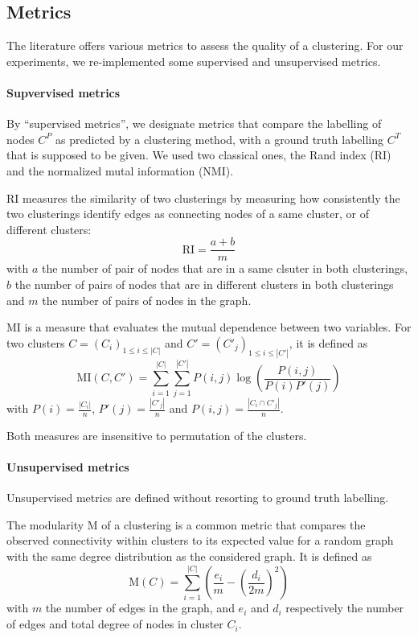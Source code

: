 \documentclass[switch, 12pt]{article}
\begin{document}
\begin{multicols}{2}
    \subsection{Metrics}
    \label{subsec:metrics}

    The literature offers various metrics to assess the quality of a clustering. For our experiments, we re-implemented some supervised and unsupervised metrics.

    \paragraph{Supvervised metrics} By ``supervised metrics'', we designate metrics that compare the labelling of nodes $C^P$ as predicted by a clustering method, with a ground truth labelling $C^T$ that is supposed to be given. We used two classical ones, the Rand index (RI) and the normalized mutal information (NMI).

    RI measures the similarity of two clusterings by measuring how consistently the two clusterings identify edges as connecting nodes of a same cluster, or of different clusters:
    \begin{equation}
        \mathrm{RI} = \frac{a + b}{m}
    \end{equation}
    with $a$ the number of pair of nodes that are in a same clsuter in both clusterings, $b$ the number of pairs of nodes that are in different clusters in both clusterings and $m$ the number of pairs of nodes in the graph.

    MI is a measure that evaluates the mutual dependence between two variables. For two clusters $C = (C_i)_{1 \leq i \leq |C|}$ and $C' = (C'_j)_{1 \leq i \leq |C'|}$, it is defined as
    \begin{equation}
        \mathrm{MI}(C, C') = \sum_{i=1}^{|C|} \sum_{j=1}^{|C'|} P(i, j) \log\left(\frac{P(i,j)}{P(i)P'(j)}\right)
    \end{equation}
    with $P(i) = \frac{|C_i|}{n}$, $P'(j) = \frac{|C'_j|}{n}$ and $P(i,j) = \frac{|C_i \cap C'_j|}{n}$.

    Both measures are insensitive to permutation of the clusters.

    \paragraph{Unsupervised metrics} Unsupervised metrics are defined without resorting to ground truth labelling.

    The modularity M of a clustering is a common metric that compares the observed connectivity within clusters to its expected value for a random graph with the same degree distribution as the considered graph. It is defined as
    \begin{equation}
        \mathrm{M}(C) = \sum_{i=1}^{|C|} \left(\frac{e_i}{m} - \left(\frac{d_i}{2m}\right)^2 \right)
    \end{equation}
    with $m$ the number of edges in the graph, and $e_i$ and $d_i$ respectively the number of edges and total degree of nodes in cluster $C_i$.


\end{multicols}
\end{document}
